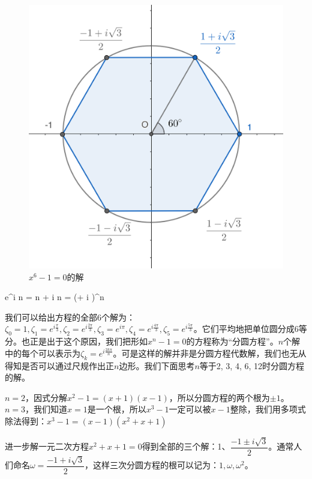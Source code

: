 \documentclass[b5paper]{ctexart}
\begin{document}
\begin{figure}[htbp]
 \centering
 \includegraphics[scale=2]{img/cyclotomic-6.png}
 \caption{$x^6 - 1 = 0$的解}
 \label{fig:cyclotomic-6}
\end{figure}

\be
e^{i n \theta} = \cos n \theta + i \sin n \theta = (\cos \theta + i \sin \theta)^n
\ee

我们可以给出方程的全部6个解为：$\zeta_0 = 1, \zeta_1 = e^{i\frac{\pi}{3}}, \zeta_2 = e^{i\frac{2\pi}{3}}, \zeta_3 = e^{i\pi}, \zeta_4 = e^{i\frac{4\pi}{3}}, \zeta_5 = e^{i\frac{5\pi}{3}}$。它们平均地把单位圆分成6等分。也正是出于这个原因，我们把形如$x^n - 1 = 0$的方程称为“分圆方程”。$n$个解中的每个可以表示为$\zeta_k = e^{i\frac{2k\pi}{n}}$。可是这样的解并非是分圆方程代数解，我们也无从得知是否可以通过尺规作出正$n$边形。我们下面思考$n$等于2, 3, 4, 6, 12时分圆方程的解。

$n = 2$，因式分解$x^2 - 1 = (x + 1)(x - 1)$，所以分圆方程的两个根为$\pm 1$。$n=3$，我们知道$x = 1$是一个根，所以$x^3 - 1$一定可以被$x - 1$整除，我们用多项式除法得到：$x^3 - 1 = (x - 1) (x^2 + x + 1)$


进一步解一元二次方程$x^2 + x + 1 = 0$得到全部的三个解：1、$\dfrac{-1 \pm i \sqrt{3}}{2}$。通常人们命名$\omega = \dfrac{-1 + i \sqrt{3}}{2}$，这样三次分圆方程的根可以记为：$1, \omega, \omega^2$。
\end{document}
